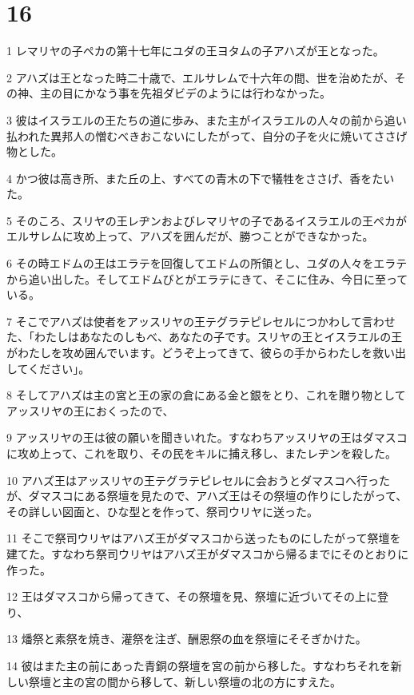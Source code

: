 \chapter{16}

\par 1 レマリヤの子ペカの第十七年にユダの王ヨタムの子アハズが王となった。
\par 2 アハズは王となった時二十歳で、エルサレムで十六年の間、世を治めたが、その神、主の目にかなう事を先祖ダビデのようには行わなかった。
\par 3 彼はイスラエルの王たちの道に歩み、また主がイスラエルの人々の前から追い払われた異邦人の憎むべきおこないにしたがって、自分の子を火に焼いてささげ物とした。
\par 4 かつ彼は高き所、また丘の上、すべての青木の下で犠牲をささげ、香をたいた。
\par 5 そのころ、スリヤの王レヂンおよびレマリヤの子であるイスラエルの王ペカがエルサレムに攻め上って、アハズを囲んだが、勝つことができなかった。
\par 6 その時エドムの王はエラテを回復してエドムの所領とし、ユダの人々をエラテから追い出した。そしてエドムびとがエラテにきて、そこに住み、今日に至っている。
\par 7 そこでアハズは使者をアッスリヤの王テグラテピレセルにつかわして言わせた、「わたしはあなたのしもべ、あなたの子です。スリヤの王とイスラエルの王がわたしを攻め囲んでいます。どうぞ上ってきて、彼らの手からわたしを救い出してください」。
\par 8 そしてアハズは主の宮と王の家の倉にある金と銀をとり、これを贈り物としてアッスリヤの王におくったので、
\par 9 アッスリヤの王は彼の願いを聞きいれた。すなわちアッスリヤの王はダマスコに攻め上って、これを取り、その民をキルに捕え移し、またレヂンを殺した。
\par 10 アハズ王はアッスリヤの王テグラテピレセルに会おうとダマスコへ行ったが、ダマスコにある祭壇を見たので、アハズ王はその祭壇の作りにしたがって、その詳しい図面と、ひな型とを作って、祭司ウリヤに送った。
\par 11 そこで祭司ウリヤはアハズ王がダマスコから送ったものにしたがって祭壇を建てた。すなわち祭司ウリヤはアハズ王がダマスコから帰るまでにそのとおりに作った。
\par 12 王はダマスコから帰ってきて、その祭壇を見、祭壇に近づいてその上に登り、
\par 13 燔祭と素祭を焼き、灌祭を注ぎ、酬恩祭の血を祭壇にそそぎかけた。
\par 14 彼はまた主の前にあった青銅の祭壇を宮の前から移した。すなわちそれを新しい祭壇と主の宮の間から移して、新しい祭壇の北の方にすえた。
